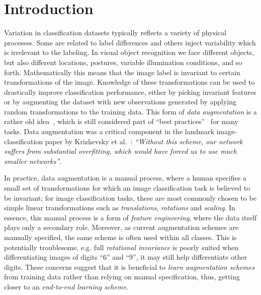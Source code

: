 \documentclass[twoside]{article}
\begin{document}
  \section{Introduction}\label{sec:intro}
  Variation in classification datasets typically reflects a variety of physical processes.
  Some are related to label differences and others inject variability which is
  irrelevant to the labeling. In visual object recognition we face different objects,
  but also different locations, postures, variable illumination conditions, and so forth.
  Mathematically this means that the image label is invariant to
  certain transformations of the image.
  Knowledge of these transformations can be used to drastically improve classification performance,
  either by picking invariant features or by augmenting the dataset with new
  observations generated by applying random transformations to the training data.
  This form of \emph{data augmentation} is a rather old idea~\cite{baird1992document,simard1992tangent},
  which is still considered part of ``best practices''~\cite{simard2003best} for many tasks.
  Data augmentation was a critical component in the landmark image-classification
  paper by Krizhevsky et al.~\cite{HintonImageNet2012}:
  \emph{``Without this scheme, our network suffers from substantial overfitting,
  which would have forced us to use much smaller networks''}.
  
  In practice, data augmentation is a manual process, where a human specifies
  a small set of transformations for which an image classification task is believed to be invariant; 
  for image classification tasks, these are most commonly chosen to be simple linear transformations such as 
  \emph{translations}, \emph{rotations} and \emph{scaling}. In essence, this manual process is
  a form of \emph{feature engineering}, where the data itself 
  plays only a secondary role. 
  Moreover, as current augmentation schemes are manually specified, the same scheme
  is often used within all classes. This is potentially troublesome, e.g.\while
  full \emph{rotational invariance} is poorly suited when differentiating images
  of digits ``6'' and ``9'', it may still help differentiate other digits.
  These concerns suggest
  that it is beneficial to \emph{learn augmentation schemes}
  from training data rather than relying on manual specification, thus, getting
  closer to an \emph{end-to-end learning scheme}.
  
\end{document}
